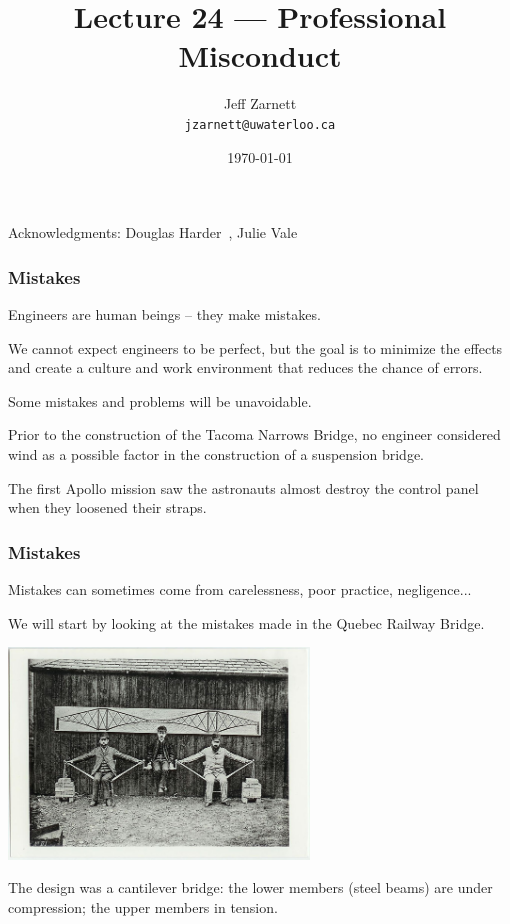 

\title{Lecture 24 --- Professional Misconduct }

\author{Jeff Zarnett \\ \small \texttt{jzarnett@uwaterloo.ca}}
\date{\today}




\begin{frame}
  \titlepage

\begin{center}
  \small{Acknowledgments: Douglas Harder~\cite{dwh}, Julie Vale~\cite{jv}}
  \end{center}
\end{frame}



\begin{frame}
\frametitle{Mistakes}

Engineers are human beings -- they make mistakes.

We cannot expect engineers to be perfect, but the goal is to minimize the effects and create a culture and work environment that reduces the chance of errors.

Some mistakes and problems will be unavoidable.

Prior to the construction of the Tacoma Narrows Bridge, no engineer considered wind as a possible factor in the construction of a suspension bridge.

The first Apollo mission saw the astronauts almost destroy the control panel when they loosened their straps.

\end{frame}



\begin{frame}
\frametitle{Mistakes}

Mistakes can sometimes come from carelessness, poor practice, negligence...

We will start by looking at the mistakes made in the Quebec Railway Bridge.

\begin{center}
 \includegraphics[width=0.6\textwidth]{images/suspension-bridge-principle}
\end{center}

The design was a cantilever bridge: the lower members (steel beams) are under compression; the upper members in tension.

\end{frame}



